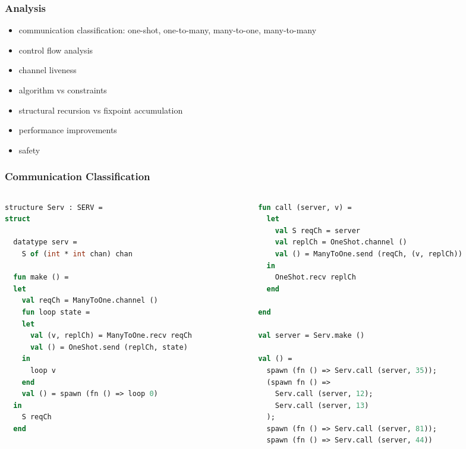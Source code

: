 \documentclass{beamer}
\begin{document}
\begin{frame}
\frametitle{Analysis}
\begin{itemize}
\item communication classification: one-shot, one-to-many, many-to-one, many-to-many
\item control flow analysis
\item channel liveness
\item algorithm vs constraints
\item structural recursion vs fixpoint accumulation
\item performance improvements
\item safety
\end{itemize}
\end{frame}



\begin{frame}[fragile]
\frametitle{Communication Classification}
\begin{columns}
\begin{column}{0.5\textwidth}
\begin{lstlisting}[language=ML, mathescape]
structure Serv : SERV =
struct 

  datatype serv =
    S of (int * int chan) chan 

  fun make () =
  let 
    val reqCh = ManyToOne.channel ()
    fun loop state =
    let
      val (v, replCh) = ManyToOne.recv reqCh
      val () = OneShot.send (replCh, state)
    in
      loop v
    end
    val () = spawn (fn () => loop 0)
  in
    S reqCh
  end 
\end{lstlisting}
\end{column}


\begin{column}{0.5\textwidth}
\begin{lstlisting}[language=ML, mathescape]
  fun call (server, v) =
  let 
    val S reqCh = server
    val replCh = OneShot.channel ()
    val () = ManyToOne.send (reqCh, (v, replCh))
  in
    OneShot.recv replCh
  end

end

val server = Serv.make ()

val () =
  spawn (fn () => Serv.call (server, 35));
  (spawn fn () => 
    Serv.call (server, 12); 
    Serv.call (server, 13)
  );
  spawn (fn () => Serv.call (server, 81));
  spawn (fn () => Serv.call (server, 44))
\end{lstlisting}
\end{column}
\end{columns}
\end{frame}
\end{document}
